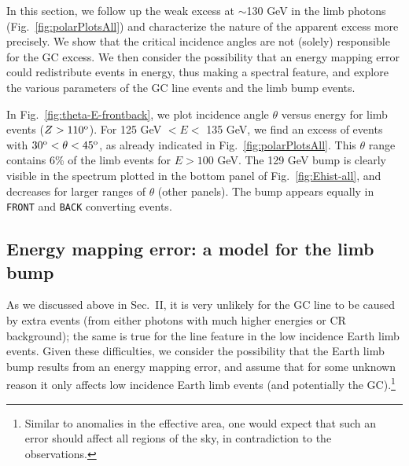 \documentclass[aps,twocolumn,prd,superscriptaddress,showpacs,nofootinbib,fixfloat]{revtex4}
\newcommand{\degree}{^{\rm o}}
\begin{document}


In this section, we follow up the weak excess at $\sim$130 GeV 
in the limb photons
(Fig.~\ref{fig:polarPlotsAll})
and
characterize the nature of the apparent excess more precisely.  We show that
the critical incidence angles are not (solely) responsible for
the GC excess. 
We then
consider the possibility
that an energy mapping error could redistribute events in energy,
thus making a spectral feature, and
explore the various
parameters of the GC line events and the limb bump events.
\medskip

In Fig.~\ref{fig:theta-E-frontback}, we plot incidence angle $\theta$ versus
energy for limb events ($Z > 110\degree$).  For 125 GeV $< E <$ 135 GeV, we find
an excess of events with $30\degree < \theta < 45\degree$, as already indicated
in Fig.~\ref{fig:polarPlotsAll}.  This $\theta$ range contains 6\% of
the limb events for $E>100$ GeV. The 129 GeV bump is clearly visible in the
spectrum plotted in
the bottom panel of Fig.~\ref{fig:Ehist-all}, and decreases for
larger ranges of $\theta$ (other panels).  The bump appears equally in
\texttt{FRONT} and \texttt{BACK} converting events.

\subsection{Energy mapping error: a model for the limb bump}

 
As we discussed above in Sec.~II, it is very unlikely for the
GC line to be caused by extra events (from either photons with much higher
energies or CR background); the same is true for the line feature in the low
incidence Earth limb events.  Given these difficulties, we consider the
possibility that the Earth limb bump results from an energy mapping error, and
assume that for some unknown reason it only affects low incidence Earth limb
events (and potentially the GC).\footnote{Similar to anomalies in the
effective area, one would expect that such an error should affect all
regions of the sky, in contradiction to the observations.}
\end{document}
